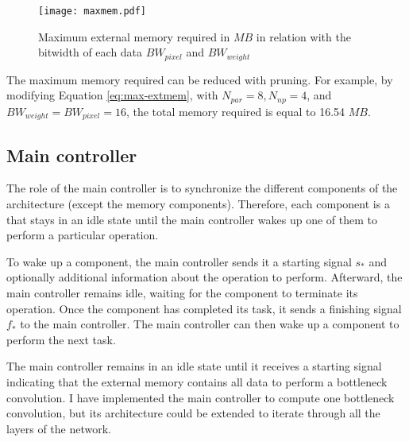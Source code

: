 %
\begin{figure}[H]
    \centering
    \texttt{[image: maxmem.pdf]}
    \caption{Maximum external memory required in $MB$ in relation with the bitwidth of each data $BW_{pixel}$ and $BW_{weight}$}
    \label{fig:max-mem}
\end{figure}
%
The maximum memory required can be reduced with pruning. For example, by modifying Equation \eqref{eq:max-extmem}, with $N_{par} = 8, N_{np} = 4$, and $BW_{weight} = BW_{pixel} = 16$, the total memory required is equal to 16.54 $MB$.
%
\subsection{Main controller}
%
The role of the main controller is to synchronize the different components of the architecture (except the memory components).  Therefore, each component is a  that stays in an idle state until the main controller wakes up one of them to perform a particular operation.

To wake up a component, the main controller sends it a starting signal $s_{*}$ and optionally additional information about the operation to perform. Afterward, the main controller remains idle, waiting for the component to terminate its operation. Once the component has completed its task, it sends a finishing signal $f_{*}$ to the main controller. The main controller can then wake up a component to perform the next task.

The main controller remains in an idle state until it receives a starting signal indicating that the external memory contains all data to perform a bottleneck convolution. I have implemented the main controller to compute one bottleneck convolution, but its architecture could be extended to iterate through all the layers of the network.

